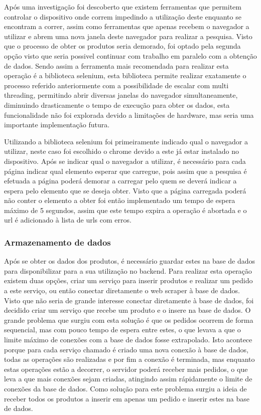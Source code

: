 Após uma investigação foi descoberto que existem ferramentas que permitem controlar o dispositivo onde correm impedindo a utilização deste enquanto se 
encontram a correr, assim como ferramentas que apenas recebem o navegador a utilizar e abrem uma nova janela deste navegador para realizar a pesquisa.
Visto que o processo de obter os produtos seria demorado, foi optado pela segunda opção visto que seria possivel continuar com trabalho em paralelo com a
obtenção de dados. Sendo assim a ferramenta mais recomendada para realizar esta operação é a biblioteca selenium, esta biblioteca permite realizar exatamente
o processo referido anteriormente com a possibilidade de escalar com multi threading, permitindo abrir diversas janelas do navegador simultaneamente,
diminuindo drasticamente o tempo de execução para obter os dados, esta funcionalidade não foi explorada devido a limitações de hardware, 
mas seria uma importante implementação futura.

Utilizando a biblioteca selenium foi primeiramente indicado qual o navegador a utilizar, neste caso foi escolhido o chrome devido a este já estar instalado
no dispositivo. Após se indicar qual o navegador a utilizar, é necessário para cada página indicar qual elemento esperar que carregue, pois assim que a pesquisa
é efetuada a página poderá demorar a carregar pelo quem se deverá indicar a espera pelo elemento que se deseja obter. Visto que a página carregada poderá não
conter o elemento a obter foi então implementado um tempo de espera máximo de 5 segundos, assim que este tempo expira a operação é abortada e o url é adicionado
à lista de urls com erros.

\newpage

\subsubsection{Armazenamento de dados}

Após se obter os dados dos produtos, é necessário guardar estes na base de dados para disponibilizar para a sua utilização no backend. Para realizar
esta operação existem duas opções, criar um serviço para inserir produtos e realizar um pedido a este serviço, ou então conectar diretamente
o web scraper à base de dados. Visto que não seria de grande interesse conectar diretamente à base de dados, foi decidido criar um serviço que recebe um produto e o 
insere na base de dados. O grande problema que surgiu com esta solução é que os pedidos ocorrem de forma sequencial, mas com pouco tempo de espera entre estes, o que
levava a que o limite máximo de conexões com a base de dados fosse extrapolado. Isto acontece porque para cada serviço chamado é criado uma nova conexão à base de 
dados, todas as operações são realizadas e por fim a conexão é terminada, mas enquanto estas operações estão a decorrer, o servidor poderá receber mais pedidos, o que 
leva a que mais conexões sejam criadas, atingindo assim rápidamente o limite de conexões da base de dados. Como solução para este problema surgiu a ideia de receber todos
os produtos a inserir em apenas um pedido e inserir estes na base de dados.

